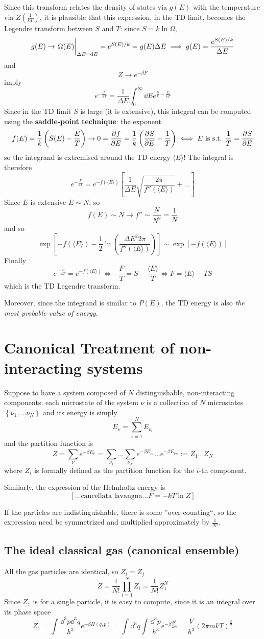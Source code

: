 Since this transform relates the density of states via $g(E)$ with the
temperature via $Z(\frac{1}{kT})$, it is plausible that this expression,
in the TD limit, becomes the Legendre transform between $S$ and $T$:
since $S=k\ln\Omega$,
$$g(E)\to \eval{\Omega(E)}_{\Delta E=\dd E} = e^{S(E)/k} = g(E)\Delta E\implies
g(E)=\frac{e^{S(E)/k}}{\Delta E}$$
and
$$Z\to e^{-\beta F}$$
imply
$$e^{-\frac{F}{kT}} = \frac{1}{\Delta E}\int_{0}^{\infty} \dd E e^{\frac{S}{k}-
\frac{E}{kT}}$$
Since in the TD limit $S$ is large (it is extensive), this integral can be
computed using the \textbf{saddle-point technique}: the exponent
$$f(E) = \frac{1}{k}\left(S(E)-\frac{E}{T}\right) \to
0 = \pdv[]{f}{E} = \frac{1}{k}\left(\pdv[]{S}{E}-\frac{1}{T}\right)\iff
E\text{ is s.t. }\frac{1}{T} = \pdv[]{S}{E}$$
so the integrand is extremised around the TD energy $\langle E\rangle$!
The integral is therefore
$$e^{-\frac{F}{kT}} = e^{-f(\langle E\rangle)}\left[\frac{1}{\Delta E}
\sqrt{\frac{2\pi}{f''(\langle E\rangle)}} + ...\right]$$
Since $E$ is extensive $E\sim N$, so
$$f(E) \sim N \to f''\sim \frac{N}{N^2} = \frac{1}{N}$$
and so
$$\exp\left[-f(\langle E\rangle) - \frac{1}{2}\ln\left(\frac{\Delta E^2 2\pi}
{f''(\langle E\rangle)}\right)\right]\sim\exp\left[-f(\langle E\rangle)\right]$$
Finally
$$e^{-\frac{F}{kT}} = e^{-f(\langle E\rangle)} \iff -\frac{F}{T} = S-
\frac{\langle E\rangle}{T}\iff \boxed{F = \langle E\rangle-TS}$$
which is the TD Legendre transform.

Moreover, since the integrand is similar to $P(E)$, the TD energy is also
\textit{the most probable value of energy}.
\section{Canonical Treatment of non-interacting systems}
Suppose to have a system composed of $N$ distinguishable, non-interacting
components: each microstate of the system $\nu$ is a collection of $N$ microstates
$\left\{\nu_1,...\nu_N\right\}$ and its energy is simply
$$E_\nu = \sum_{i=1}^{N}E_{\nu_i}$$
and the partition function is
$$Z = \sum_{\nu}^{}e^{-\beta E_\nu} = \sum_{\nu_1}...\sum_{\nu_N}^{}
e^{-\beta E_{\nu_1}}...e^{-\beta E_{\nu_N}}:= Z_1...Z_N$$
where $Z_i$ is formally defined as the partition function for the $i$-th 
component.

Similarly, the expression of the Helmholtz energy is
$$[...\text{cancellata lavangna...} F=-kT\ln Z]$$

If the particles are indistinguishable, there is some ''over-counting``, so the
expression need be symmetrized and multiplied approximately by $\frac{1}{N!}$.
\subsection{The ideal classical gas (canonical ensemble)}
All the gas particles are identical, so $Z_i=Z_j$
$$Z = \frac{1}{N!}\prod_{i=1}^{N}Z_i = \frac{1}{N!}Z_1^{N}$$
Since $Z_1$ is for a single particle, it is easy to compute, since it is an
integral over its phase space
$$Z_1 = \int_{}^{} \frac{\dd ^3p\dd^3q}{h^3} e^{-\beta H(q,p)}=
\int_{}^{} \dd^3q\int_{}^{} \frac{\dd^3p}{h^3} e^{-\beta\frac{\mathbf{p}^2}{2m}}=
\frac{V}{h^3}(2\pi mkT)^{\frac{3}{2}}
$$
